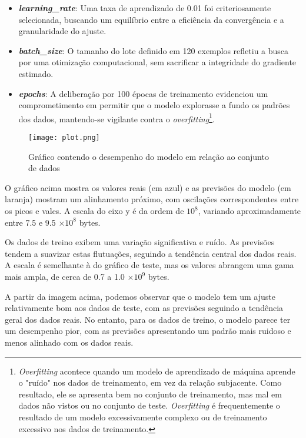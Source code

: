 \begin{itemize}
\item \textbf{\textit{learning\_rate}}: Uma taxa de aprendizado de 0.01 foi criteriosamente selecionada, buscando um equilíbrio entre a eficiência da convergência e a granularidade do ajuste.

\item \textbf{\textit{batch\_size}}: O tamanho do lote definido em 120 exemplos refletiu a busca por uma otimização computacional, sem sacrificar a integridade do gradiente estimado.

\item \textbf{\textit{epochs}}: A deliberação por 100 épocas de treinamento evidenciou um comprometimento em permitir que o modelo explorasse a fundo os padrões dos dados, mantendo-se vigilante contra o \textit{overfitting}\footnote{\textit{Overfitting} acontece quando um modelo de aprendizado de máquina aprende o "ruído" nos dados de treinamento, em vez da relação subjacente. Como resultado, ele se apresenta bem no conjunto de treinamento, mas mal em dados não vistos ou no conjunto de teste. \textit{Overfitting} é frequentemente o resultado de um modelo excessivamente complexo ou de treinamento excessivo nos dados de treinamento.}.

\end{itemize}

\begin{figure}[h]
    \centering
     \caption{Gráfico contendo o desempenho do modelo em relação ao conjunto de dados}
    \texttt{[image: plot.png]}
    \label{fig:enter-label}
\end{figure}

  O gráfico acima mostra os valores reais (em azul) e as previsões do modelo (em laranja) mostram um alinhamento próximo, com oscilações correspondentes entre os picos e vales. A escala do eixo y é da ordem de \(10^8\), variando aproximadamente entre 7.5 e 9.5 \( \times 10^8 \) bytes.
  
  Os dados de treino exibem uma variação significativa e ruído. As previsões tendem a suavizar estas flutuações, seguindo a tendência central dos dados reais. A escala é semelhante à do gráfico de teste, mas os valores abrangem uma gama mais ampla, de cerca de 0.7 a 1.0 \( \times 10^9 \) bytes.

A partir da imagem acima, podemos observar que o modelo tem um ajuste relativamente bom aos dados de teste, com as previsões seguindo a tendência geral dos dados reais. No entanto, para os dados de treino, o modelo parece ter um desempenho pior, com as previsões apresentando um padrão mais ruidoso e menos alinhado com os dados reais.

